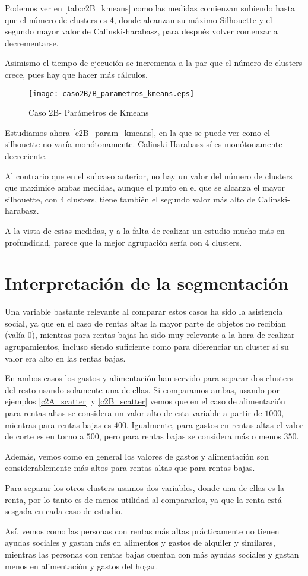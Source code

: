 Podemos ver en \eqref{tab:c2B_kmeans} como las medidas comienzan subiendo hasta que el número de clusters es 4, donde alcanzan su máximo Silhouette y el segundo mayor valor de Calinski-harabasz, para después volver comenzar a decrementarse.

Asimismo el tiempo de ejecución se incrementa a la par que el número de clusters crece, pues hay que hacer más cálculos.

\begin{figure}[H]
\caption{Caso 2B- Parámetros de Kmeans}
\label{c2B_param_kmeans}
\texttt{[image: caso2B/B\_parametros\_kmeans.eps]}
\end{figure}

Estudiamos ahora \eqref{c2B_param_kmeans}, en la que se puede ver como el silhouette no varía monótonamente. Calinski-Harabasz sí es monótonamente decreciente.

Al contrario que en el subcaso anterior, no hay un valor del número de clusters que maximice ambas medidas, aunque el punto en el que se alcanza el mayor silhouette, con 4 clusters, tiene también el segundo valor más alto de Calinski-harabasz.

A la vista de estas medidas, y a la falta de realizar un estudio mucho más en profundidad, parece que la mejor agrupación sería con 4 clusters.


\section{Interpretación de la segmentación}

Una variable bastante relevante al comparar estos casos ha sido la asistencia social, ya que en el caso de rentas altas la mayor parte de objetos no recibían (valía 0), mientras para rentas bajas ha sido muy relevante a la hora de realizar agrupamientos, incluso siendo suficiente como para diferenciar un cluster si su valor era alto en las rentas bajas.

En ambos casos los gastos y alimentación han servido para separar dos clusters del resto usando solamente una de ellas. Si comparamos ambas, usando por ejemplos \eqref{c2A_scatter} y \eqref{c2B_scatter} vemos que en el caso de alimentación para rentas altas se considera un valor alto de esta variable a partir de $1000$, mientras para rentas bajas es $400$. Igualmente, para gastos en rentas altas el valor de corte es en torno a $500$, pero para rentas bajas se considera más o menos $350$.

Además, vemos como en general los valores de gastos y alimentación son considerablemente más altos para rentas altas que para rentas bajas.

Para separar los otros clusters usamos dos variables, donde una de ellas es la renta, por lo tanto es de menos utilidad al compararlos, ya que la renta está sesgada en cada caso de estudio.

Así, vemos como las personas con rentas más altas prácticamente no tienen ayudas sociales y gastan más en alimentos y gastos de alquiler y similares, mientras las personas con rentas bajas cuentan con más ayudas sociales y gastan menos en alimentación y gastos del hogar.




